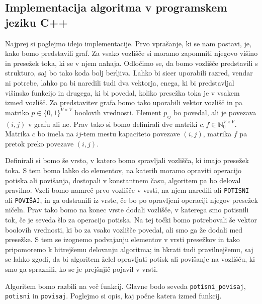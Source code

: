 \documentclass[mat1]{fmfdelo}
\newcommand{\N}{\mathbb N}
\begin{document}
\subsection{Implementacija algoritma v programskem jeziku C++}

Najprej si poglejmo idejo implementacije. Prvo vprašanje, ki se nam postavi, je, kako bomo predstavili graf. Za vsako vozlišče si moramo zapomniti njegovo višino in presežek toka, ki se v njem nahaja. Odločimo se, da bomo vozlišče predstavili s strukturo, saj bo tako koda bolj berljiva. Lahko bi sicer uporabili razred, vendar ni potrebe, lahko pa bi naredili tudi dva vektorja, enega, ki bi predstavljal višinsko funkcijo in drugega, ki bi povedal, koliko presežka toka je v vsakem izmed vozlišč. Za predstavitev grafa bomo tako uporabili vektor vozlišč in pa matriko $p\in \{0,1\}^{V \times V}$ boolovih vrednosti. Element $p_{ij}$ bo povedal, ali je povezava $(i,j)$ v grafu ali ne. Prav tako si bomo definirali dve matriki $c, f \in \N_0^{V \times V}$. Matrika $c$ bo imela na $ij$-tem mestu kapaciteto povezave $(i,j)$, matrika $f$ pa pretok preko povezave $(i,j)$.

Definirali si bomo še vrsto, v katero bomo spravljali vozlišča, ki imajo presežek toka. S tem bomo lahko do elementov, na katerih moramo opraviti operacijo potiska ali povišanja, dostopali v konstantnem času, algoritem pa bo deloval pravilno. Vzeli bomo namreč prvo vozlišče v vrsti, na njem naredili ali \texttt{POTISNI} ali \texttt{POVIŠAJ}, in ga odstranili iz vrste, če bo po opravljeni operaciji njegov presežek ničeln. Prav tako bomo na konec vrste dodali vozlišče, v katerega smo potisnili tok, če je seveda šlo za operacijo potiska. Na tej točki bomo potrebovali še vektor boolovih vrednosti, ki bo za vsako vozlišče povedal, ali smo ga že dodali med presežke. S tem se izognemo podvajanju elementov v vrsti presežkov in tako pripomoremo k hitrejšemu delovanju algoritma; in hkrati tudi pravilnejšemu, saj se lahko zgodi, da bi algoritem želel opravljati potisk ali povišanje na vozlišču, ki smo ga spraznili, ko se je prejšnjič pojavil v vrsti.

Algoritem bomo razbili na več funkcij. Glavne bodo seveda \texttt{potisni\_povisaj}, \texttt{potisni} in \texttt{povisaj}. Poglejmo si opis, kaj počne katera izmed funkcij.
\end{document}
